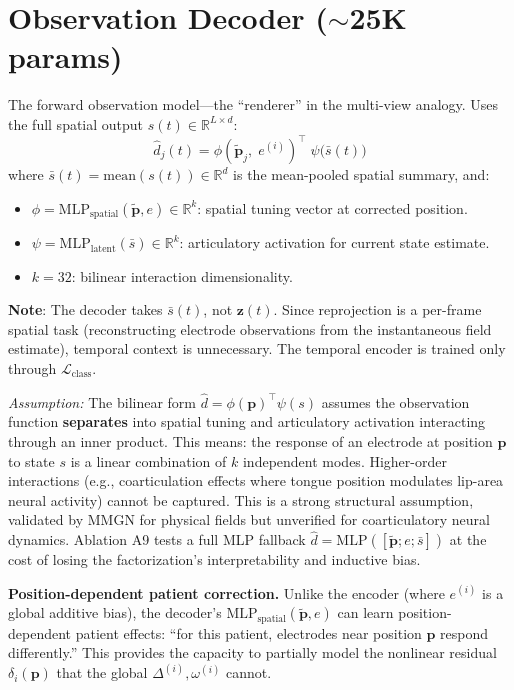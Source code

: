 \documentclass[11pt,letterpaper]{article}
\newcommand{\assumption}[1]{\par\smallskip\noindent\textcolor{BrickRed}{\textit{Assumption:} #1}\smallskip}
\newcommand{\bfp}{\mathbf{p}}
\newcommand{\bfz}{\mathbf{z}}
\newcommand{\R}{\mathbb{R}}
\begin{document}
\section{Observation Decoder (${\sim}$25K params)}\label{sec:obs-decoder}

The forward observation model---the ``renderer'' in the multi-view analogy. Uses the full spatial output $s(t) \in \R^{L \times d}$:
\begin{equation}\label{eq:bilinear}
\boxed{\hat{d}_j(t) = \phi(\tilde{\bfp}_j,\; e^{(i)})^\top \;\psi\bigl(\bar{s}(t)\bigr)}
\end{equation}
where $\bar{s}(t) = \text{mean}(s(t)) \in \R^d$ is the mean-pooled spatial summary, and:
\begin{itemize}[leftmargin=2em]
\item $\phi = \text{MLP}_{\text{spatial}}(\tilde{\bfp}, e) \in \R^k$: spatial tuning vector at corrected position.
\item $\psi = \text{MLP}_{\text{latent}}(\bar{s}) \in \R^k$: articulatory activation for current state estimate.
\item $k = 32$: bilinear interaction dimensionality.
\end{itemize}

\textbf{Note}: The decoder takes $\bar{s}(t)$, not $\bfz(t)$. Since reprojection is a per-frame spatial task (reconstructing electrode observations from the instantaneous field estimate), temporal context is unnecessary. The temporal encoder is trained only through $\mathcal{L}_{\text{class}}$.

\assumption{The bilinear form $\hat{d} = \phi(\bfp)^\top \psi(s)$ assumes the observation function \textbf{separates} into spatial tuning and articulatory activation interacting through an inner product. This means: the response of an electrode at position $\bfp$ to state $s$ is a linear combination of $k$ independent modes. Higher-order interactions (e.g., coarticulation effects where tongue position modulates lip-area neural activity) cannot be captured. This is a strong structural assumption, validated by MMGN for physical fields but unverified for coarticulatory neural dynamics. Ablation A9 tests a full MLP fallback $\hat{d} = \text{MLP}([\tilde{\bfp}; e; \bar{s}])$ at the cost of losing the factorization's interpretability and inductive bias.}

\textbf{Position-dependent patient correction.} Unlike the encoder (where $e^{(i)}$ is a global additive bias), the decoder's $\text{MLP}_{\text{spatial}}(\tilde{\bfp}, e)$ can learn position-dependent patient effects: ``for this patient, electrodes near position $\bfp$ respond differently.'' This provides the capacity to partially model the nonlinear residual $\delta_i(\bfp)$ that the global $\Delta^{(i)}, \omega^{(i)}$ cannot.
\end{document}

